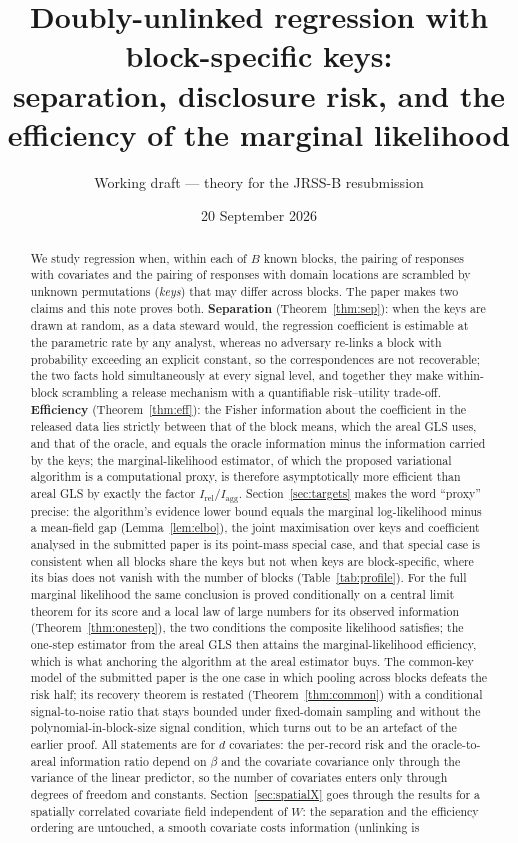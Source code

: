\documentclass[11pt]{article}
\title{Doubly-unlinked regression with block-specific keys:\\ separation, disclosure risk, and the efficiency of the marginal likelihood}
\author{Working draft --- theory for the JRSS-B resubmission}
\date{20 September 2026}
\theoremstyle{definition}
\newcommand{\rel}{\mathrm{rel}}
\newcommand{\agg}{\mathrm{agg}}
\begin{document}
\maketitle

\begin{abstract}
We study regression when, within each of $B$ known blocks, the pairing of responses with covariates and the pairing of responses with domain locations are scrambled by unknown permutations (\emph{keys}) that may differ across blocks. The paper makes two claims and this note proves both. \textbf{Separation} (Theorem~\ref{thm:sep}): when the keys are drawn at random, as a data steward would, the regression coefficient is estimable at the parametric rate by any analyst, whereas no adversary re-links a block with probability exceeding an explicit constant, so the correspondences are not recoverable; the two facts hold simultaneously at every signal level, and together they make within-block scrambling a release mechanism with a quantifiable risk--utility trade-off. \textbf{Efficiency} (Theorem~\ref{thm:eff}): the Fisher information about the coefficient in the released data lies strictly between that of the block means, which the areal GLS uses, and that of the oracle, and equals the oracle information minus the information carried by the keys; the marginal-likelihood estimator, of which the proposed variational algorithm is a computational proxy, is therefore asymptotically more efficient than areal GLS by exactly the factor $I_\rel/I_\agg$. Section~\ref{sec:targets} makes the word ``proxy'' precise: the algorithm's evidence lower bound equals the marginal log-likelihood minus a mean-field gap (Lemma~\ref{lem:elbo}), the joint maximisation over keys and coefficient analysed in the submitted paper is its point-mass special case, and that special case is consistent when all blocks share the keys but not when keys are block-specific, where its bias does not vanish with the number of blocks (Table~\ref{tab:profile}). For the full marginal likelihood the same conclusion is proved conditionally on a central limit theorem for its score and a local law of large numbers for its observed information (Theorem~\ref{thm:onestep}), the two conditions the composite likelihood satisfies; the one-step estimator from the areal GLS then attains the marginal-likelihood efficiency, which is what anchoring the algorithm at the areal estimator buys. The common-key model of the submitted paper is the one case in which pooling across blocks defeats the risk half; its recovery theorem is restated (Theorem~\ref{thm:common}) with a conditional signal-to-noise ratio that stays bounded under fixed-domain sampling and without the polynomial-in-block-size signal condition, which turns out to be an artefact of the earlier proof. All statements are for $d$ covariates: the per-record risk and the oracle-to-areal information ratio depend on $\beta$ and the covariate covariance only through the variance of the linear predictor, so the number of covariates enters only through degrees of freedom and constants. Section~\ref{sec:spatialX} goes through the results for a spatially correlated covariate field independent of $W$: the separation and the efficiency ordering are untouched, a smooth covariate costs information (unlinking is 
\end{abstract}
\end{document}
